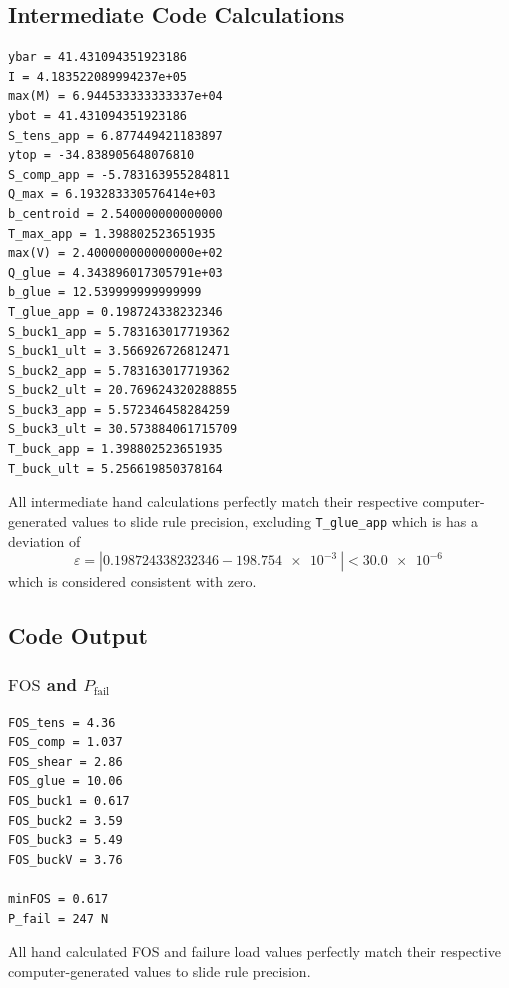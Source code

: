 \documentclass[11pt, fleqn]{article}
\begin{document}
\subsection{Intermediate Code Calculations}
\begin{lstlisting}[]
ybar = 41.431094351923186
I = 4.183522089994237e+05
max(M) = 6.944533333333337e+04
ybot = 41.431094351923186
S_tens_app = 6.877449421183897
ytop = -34.838905648076810
S_comp_app = -5.783163955284811
Q_max = 6.193283330576414e+03
b_centroid = 2.540000000000000
T_max_app = 1.398802523651935
max(V) = 2.400000000000000e+02
Q_glue = 4.343896017305791e+03
b_glue = 12.539999999999999
T_glue_app = 0.198724338232346
S_buck1_app = 5.783163017719362
S_buck1_ult = 3.566926726812471
S_buck2_app = 5.783163017719362
S_buck2_ult = 20.769624320288855
S_buck3_app = 5.572346458284259
S_buck3_ult = 30.573884061715709
T_buck_app = 1.398802523651935
T_buck_ult = 5.256619850378164    
\end{lstlisting}

All intermediate hand calculations perfectly match their respective computer-generated values to slide rule precision, excluding \lstinline{T_glue_app} which is has a deviation of
\[ \varepsilon = \left|0.198724338232346-\SI{198.754e-3}{}\right| < \SI{30.0e-6}{} \]
which is considered consistent with zero.

\subsection{Code Output}

\subsubsection{$\mathrm{FOS}$ and $P_{\mathrm{fail}}$}
\begin{lstlisting}[]
FOS_tens = 4.36
FOS_comp = 1.037
FOS_shear = 2.86
FOS_glue = 10.06
FOS_buck1 = 0.617
FOS_buck2 = 3.59
FOS_buck3 = 5.49
FOS_buckV = 3.76
    
minFOS = 0.617
P_fail = 247 N
\end{lstlisting}

All hand calculated FOS and failure load values perfectly match their respective computer-generated values to slide rule precision.
\end{document}
